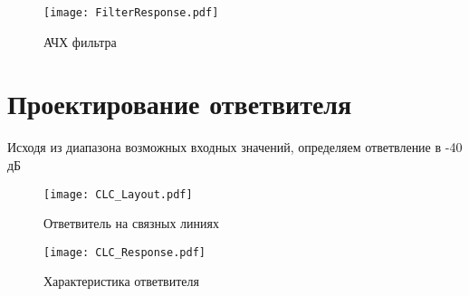 \begin{figure}[H]
	\centering
	\texttt{[image: FilterResponse.pdf]}
	\caption{АЧХ фильтра}%
	\label{fig:FilterResponse}
\end{figure}

\section{Проектирование ответвителя}

Исходя из диапазона возможных входных значений, определяем ответвление в -40 дБ

\begin{figure}[H]
	\centering
	\texttt{[image: CLC\_Layout.pdf]}
	\caption{Ответвитель на связных линиях}%
	\label{fig:CLC_Layout}
\end{figure}

\begin{figure}[H]
	\centering
	\texttt{[image: CLC\_Response.pdf]}
	\caption{Характеристика ответвителя}%
	\label{fig:CLC_Response}
\end{figure}